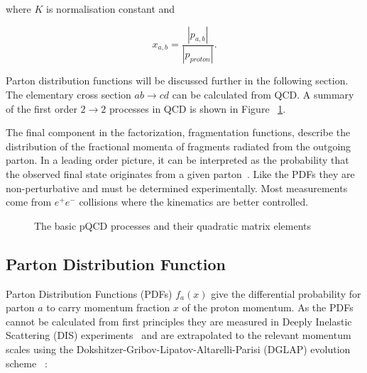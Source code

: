 \noindent where $K$ is normalisation constant and

\begin{equation}
x_{a,b} = \frac{\left| p_{a,b} \right|}{\left| p_{proton} \right|}.
\end{equation}


Parton distribution functions will be discussed further in the following section. The elementary cross section $ab\rightarrow cd$ can be calculated from QCD. A summary of the first order $2\rightarrow2$ processes in QCD is shown in Figure ~\ref{fig:qcdlo}. 

The final component in the factorization, fragmentation functions, describe the distribution of the fractional momenta of fragments radiated from the outgoing parton.  In a leading order picture, it can be interpreted as the probability that the observed final state originates from a given parton~\cite{Metz:2016swz}. Like the PDFs they are non-perturbative and must be determined experimentally. Most measurements come from $e^+ e^-$ collisions where the kinematics are better controlled. 


%



\begin{figure}[tb]
\centering

\caption[QCD Leading Order]{The basic pQCD processes and their quadratic matrix elements}
\label{fig:qcdlo}
\end{figure}



\subsection*{Parton Distribution Function}
Parton Distribution Functions (PDFs) $f_a\left(x\right)$ give the differential probability for parton $a$ to carry momentum fraction $x$ of the proton momentum. %
As the PDFs cannot be calculated from first principles they are measured in Deeply Inelastic Scattering (DIS) experiments~\cite{Placakyte:2011az} and are extrapolated to the relevant momentum scales using the Dokshitzer-Gribov-Lipatov-Altarelli-Parisi (DGLAP) evolution scheme ~\cite{Gribov:1972ri,Altarelli:1977zs,Dokshitzer:1977sg}:%


